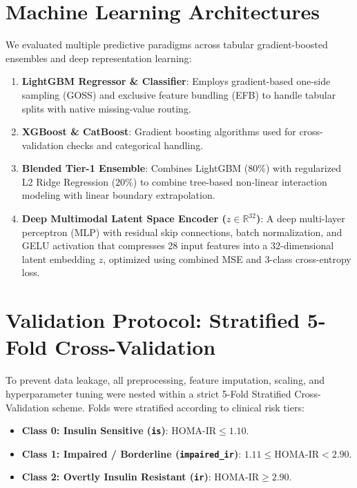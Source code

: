 \documentclass[12pt,a4paper,oneside]{report}
\begin{document}
\section{Machine Learning Architectures}
We evaluated multiple predictive paradigms across tabular gradient-boosted ensembles and deep representation learning:
\begin{enumerate}
    \item \textbf{LightGBM Regressor \& Classifier}: Employs gradient-based one-side sampling (GOSS) and exclusive feature bundling (EFB) to handle tabular splits with native missing-value routing.
    \item \textbf{XGBoost \& CatBoost}: Gradient boosting algorithms used for cross-validation checks and categorical handling.
    \item \textbf{Blended Tier-1 Ensemble}: Combines LightGBM ($80\%$) with regularized L2 Ridge Regression ($20\%$) to combine tree-based non-linear interaction modeling with linear boundary extrapolation.
    \item \textbf{Deep Multimodal Latent Space Encoder ($z \in \mathbb{R}^{32}$)}: A deep multi-layer perceptron (MLP) with residual skip connections, batch normalization, and GELU activation that compresses 28 input features into a 32-dimensional latent embedding $z$, optimized using combined MSE and 3-class cross-entropy loss.
\end{enumerate}

\section{Validation Protocol: Stratified 5-Fold Cross-Validation}
To prevent data leakage, all preprocessing, feature imputation, scaling, and hyperparameter tuning were nested within a strict 5-Fold Stratified Cross-Validation scheme. Folds were stratified according to clinical risk tiers:
\begin{itemize}
    \item \textbf{Class 0: Insulin Sensitive (\texttt{is})}: $\text{HOMA-IR} \le 1.10$.
    \item \textbf{Class 1: Impaired / Borderline (\texttt{impaired\_ir})}: $1.11 \le \text{HOMA-IR} < 2.90$.
    \item \textbf{Class 2: Overtly Insulin Resistant (\texttt{ir})}: $\text{HOMA-IR} \ge 2.90$.
\end{itemize}

\end{document}

